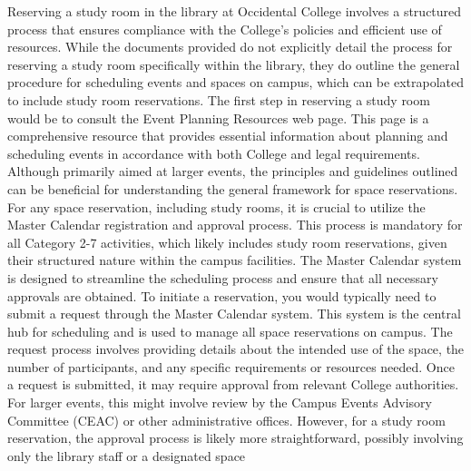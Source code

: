 \documentclass[10pt,twocolumn]{article}
\begin{document}
\begin{itemize}
Reserving a study room in the library at Occidental College involves a structured process that ensures compliance with the College's policies and efficient use of resources. While the documents provided do not explicitly detail the process for reserving a study room specifically within the library, they do outline the general procedure for scheduling events and spaces on campus, which can be extrapolated to include study room reservations. The first step in reserving a study room would be to consult the Event Planning Resources web page. This page is a comprehensive resource that provides essential information about planning and scheduling events in accordance with both College and legal requirements. Although primarily aimed at larger events, the principles and guidelines outlined can be beneficial for understanding the general framework for space reservations. For any space reservation, including study rooms, it is crucial to utilize the Master Calendar registration and approval process. This process is mandatory for all Category 2-7 activities, which likely includes study room reservations, given their structured nature within the campus facilities. The Master Calendar system is designed to streamline the scheduling process and ensure that all necessary approvals are obtained. To initiate a reservation, you would typically need to submit a request through the Master Calendar system. This system is the central hub for scheduling and is used to manage all space reservations on campus. The request process involves providing details about the intended use of the space, the number of participants, and any specific requirements or resources needed. Once a request is submitted, it may require approval from relevant College authorities. For larger events, this might involve review by the Campus Events Advisory Committee (CEAC) or other administrative offices. However, for a study room reservation, the approval process is likely more straightforward, possibly involving only the library staff or a designated space
\newline
\end{itemize}
\end{document}
